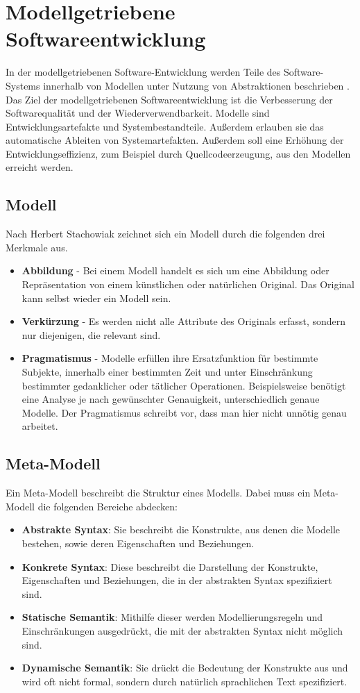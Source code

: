 \section{Modellgetriebene Softwareentwicklung}
\label{sec:mdsd}
In der modellgetriebenen Software-Entwicklung werden Teile des Software-Systems innerhalb von Modellen unter Nutzung von Abstraktionen beschrieben \cite{MDSD}. Das Ziel der modellgetriebenen Softwareentwicklung ist die Verbesserung der Softwarequalität und der Wiederverwendbarkeit. Modelle sind Entwicklungsartefakte und Systembestandteile. Außerdem erlauben sie das automatische Ableiten von Systemartefakten. Außerdem soll eine Erhöhung der Entwicklungseffizienz, zum Beispiel durch Quellcodeerzeugung, aus den Modellen erreicht werden.

\subsection{Modell}
Nach Herbert Stachowiak \cite{Stachowiak1973} zeichnet sich ein Modell durch die folgenden drei Merkmale aus.
\begin{itemize}
\item \textbf{Abbildung} - Bei einem Modell handelt es sich um eine Abbildung oder Repräsentation von einem künstlichen oder natürlichen Original. Das Original kann selbst wieder ein Modell sein. 
\item \textbf{Verkürzung} - Es werden nicht alle Attribute des Originals erfasst, sondern nur diejenigen, die relevant sind.
\item \textbf{Pragmatismus} - Modelle erfüllen ihre Ersatzfunktion für bestimmte Subjekte, innerhalb einer bestimmten Zeit und unter Einschränkung bestimmter gedanklicher oder tätlicher Operationen. Beispielsweise benötigt eine Analyse je nach gewünschter Genauigkeit, unterschiedlich genaue Modelle. Der Pragmatismus schreibt vor, dass man hier nicht unnötig genau arbeitet.
\end{itemize} 
\subsection{Meta-Modell}
Ein Meta-Modell beschreibt die Struktur eines Modells. Dabei muss ein Meta-Modell die folgenden Bereiche abdecken:
\begin{itemize}
\item \textbf{Abstrakte Syntax}: Sie beschreibt die Konstrukte, aus denen die Modelle bestehen, sowie deren Eigenschaften und Beziehungen.
\item \textbf{Konkrete Syntax}: Diese beschreibt die Darstellung der Konstrukte, Eigenschaften und Beziehungen, die in der abstrakten Syntax spezifiziert sind.
\item \textbf{Statische Semantik}: Mithilfe dieser werden Modellierungsregeln und Einschränkungen ausgedrückt, die mit der abstrakten Syntax nicht möglich sind.
\item \textbf{Dynamische Semantik}: Sie drückt die Bedeutung der Konstrukte aus und wird oft nicht formal, sondern durch natürlich sprachlichen Text spezifiziert.
\end{itemize}

